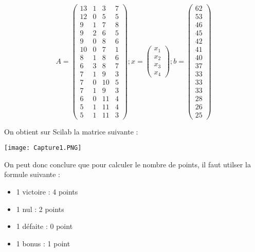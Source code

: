 \documentclass{article}
\begin{document}
$$ A = \left( \begin{matrix} 13 & 1 & 3 & 7 \\
                            12 & 0 & 5 & 5\\ 
                            9 & 1 & 7 & 8 \\ 
                            9 & 2 & 6 & 5\\ 
                            9 & 0 & 8 & 6\\ 
                            10 & 0 & 7 & 1\\ 
                            8 & 1 & 8 & 6\\ 
                            6 & 3 & 8 & 7\\
                            7 & 1 & 9 & 3\\
                            7 & 0 & 10 & 5\\
                            7 & 1 & 9 & 3\\
                            6 & 0 & 11 & 4\\
                            5 & 1 & 11 & 4\\
                            5 & 1 & 11 & 3\end{matrix} \right) 
; x = \left(\begin{matrix} x_1 \\ x_2 \\ x_3 \\x_4\end{matrix}\right)
; b = \left(\begin{matrix} 62 \\
53 \\
46 \\
45 \\
42 \\
41 \\
40 \\
37 \\
33\\
33\\
33\\
28\\
26\\
25\end{matrix}\right)$$

On obtient sur Scilab la matrice suivante : 

\begin{center}
    \texttt{[image: Capture1.PNG]}
\end{center}

On peut donc conclure que pour calculer le nombre de points, il faut utilser la formule suivante : \\
\begin{itemize}
    \item 1 victoire : 4 points\\
\item 1 nul : 2 points\\
\item 1 défaite : 0 point\\
\item 1 bonus : 1 point
\end{itemize}
\end{document}
